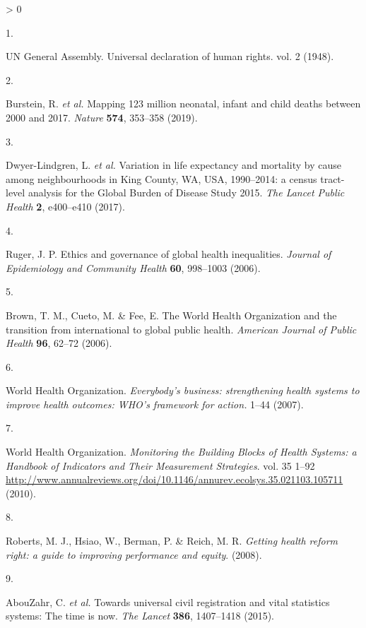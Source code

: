 \documentclass[
]{article}
\newlength{\cslhangindent}
\newlength{\csllabelwidth}
\newenvironment{CSLReferences}[2] %
 {%
  \setlength{\parindent}{0pt}
  \ifodd #1 \everypar{\setlength{\hangindent}{\cslhangindent}}\ignorespaces\fi
  \ifnum #2 > 0
  \setlength{\parskip}{#2\baselineskip}
  \fi
 }%
 {}
\newcommand{\CSLLeftMargin}[1]{\parbox[t]{\csllabelwidth}{#1}}
\newcommand{\CSLRightInline}[1]{\parbox[t]{\linewidth - \csllabelwidth}{#1}\break}
\begin{document}
\hypertarget{refs}{}
\begin{CSLReferences}{0}{0}
\leavevmode\hypertarget{ref-UNGeneralAssembly1948}{}%
\CSLLeftMargin{1. }
\CSLRightInline{UN General Assembly. {Universal declaration of human rights}. vol. 2 (1948).}

\leavevmode\hypertarget{ref-Burstein2019}{}%
\CSLLeftMargin{2. }
\CSLRightInline{Burstein, R. \emph{et al.} {Mapping 123 million neonatal, infant and child deaths between 2000 and 2017}. \emph{Nature} \textbf{574}, 353--358 (2019).}

\leavevmode\hypertarget{ref-Dwyer-Lindgren2017}{}%
\CSLLeftMargin{3. }
\CSLRightInline{Dwyer-Lindgren, L. \emph{et al.} {Variation in life expectancy and mortality by cause among neighbourhoods in King County, WA, USA, 1990--2014: a census tract-level analysis for the Global Burden of Disease Study 2015}. \emph{The Lancet Public Health} \textbf{2}, e400--e410 (2017).}

\leavevmode\hypertarget{ref-Ruger2006}{}%
\CSLLeftMargin{4. }
\CSLRightInline{Ruger, J. P. {Ethics and governance of global health inequalities}. \emph{Journal of Epidemiology and Community Health} \textbf{60}, 998--1003 (2006).}

\leavevmode\hypertarget{ref-Brown2006}{}%
\CSLLeftMargin{5. }
\CSLRightInline{Brown, T. M., Cueto, M. \& Fee, E. {The World Health Organization and the transition from international to global public health}. \emph{American Journal of Public Health} \textbf{96}, 62--72 (2006).}

\leavevmode\hypertarget{ref-WorldHealthOrganization2007}{}%
\CSLLeftMargin{6. }
\CSLRightInline{World Health Organization. \emph{{Everybody's business: strengthening health systems to improve health outcomes: WHO's framework for action.}} 1--44 (2007).}

\leavevmode\hypertarget{ref-WorldHealthOrganization2010}{}%
\CSLLeftMargin{7. }
\CSLRightInline{World Health Organization. \emph{{Monitoring the Building Blocks of Health Systems: a Handbook of Indicators and Their Measurement Strategies}}. vol. 35 1--92 \url{http://www.annualreviews.org/doi/10.1146/annurev.ecolsys.35.021103.105711} (2010).}

\leavevmode\hypertarget{ref-Roberts2008}{}%
\CSLLeftMargin{8. }
\CSLRightInline{Roberts, M. J., Hsiao, W., Berman, P. \& Reich, M. R. \emph{{Getting health reform right: a guide to improving performance and equity}}. (2008).}

\leavevmode\hypertarget{ref-AbouZahr2015}{}%
\CSLLeftMargin{9. }
\CSLRightInline{AbouZahr, C. \emph{et al.} {Towards universal civil registration and vital statistics systems: The time is now}. \emph{The Lancet} \textbf{386}, 1407--1418 (2015).}


\end{CSLReferences}
\end{document}
